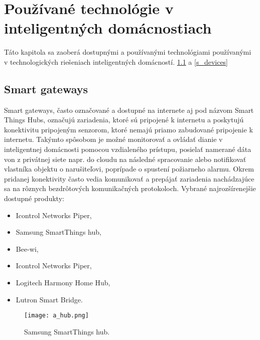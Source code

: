 \documentclass[12pt,a4wide,oneside,openright]{report}
\begin{document}

\section{Používané technológie v inteligentných domácnostiach} \label{s_solutions}
Táto kapitola sa zaoberá dostupnými a používanými technológiami používanými v technologických riešeniach inteligentných domácností.  \ref{s_smarthubs} a \ref{s_devices}
\subsection{Smart gateways} \label{s_smarthubs}
Smart gateways, často označované a dostupné na internete aj pod názvom Smart Things Hubs, označujú zariadenia, ktoré sú pripojené k internetu a poskytujú konektivitu pripojeným senzorom, ktoré nemajú priamo zabudované pripojenie k internetu. Takýmto spôsobom je možné monitorovať a ovládať dianie v inteligentnej domácnosti pomocou vzdialeného prístupu, posielať namerané dáta von z privátnej siete napr. do cloudu na následné spracovanie alebo notifikovať vlastníka objektu o narušiteľovi, poprípade o spustení požiarneho alarmu. Okrem pridanej konektivity často vedia komunikovať a prepájať zariadenia nachádzajúce sa na rôznych bezdrôtových komunikačných protokoloch.
Vybrané najrozšírenejšie dostupné produkty:
\begin{itemize}
	\item Icontrol Networks Piper,
	\item Samsung SmartThings hub,
	\item Bee-wi,
	\item Icontrol Networks Piper,
	\item Logitech Harmony Home Hub,
	\item Lutron Smart Bridge.
\end{itemize}
\onehalfspacing

\begin{figure*}[h]
	\centering
	\texttt{[image: a\_hub.png]}
	\caption{Samsung SmartThings hub.\cite{hub}}
	\label{f:o_hub}
\end{figure*}
\end{document}
